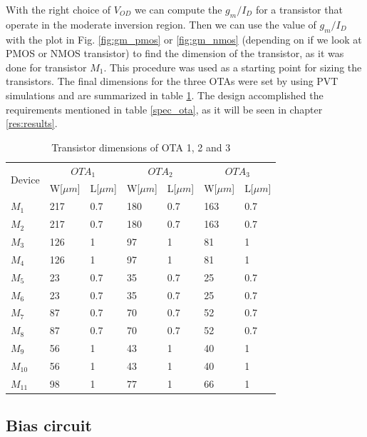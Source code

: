 With the right choice of $V_{OD}$ we can compute the $g_m/I_D$ for a transistor that operate in the moderate inversion region. Then we can use the value of $g_m/I_D$ with the plot in Fig. \ref{fig:gm_pmos} or \ref{fig:gm_nmos} (depending on if we look at PMOS or NMOS transistor) to find the dimension of the transistor, as it was done for transistor $M_1$. This procedure was used as a starting point for sizing the transistors. The final dimensions for the three OTAs were set by using PVT simulations and are summarized in table \ref{final_ota}. The design accomplished the requirements mentioned in table \ref{spec_ota}, as it will be seen in chapter \ref{res:results}.

\begin{table}[h]
\centering
\caption{Transistor dimensions of OTA 1, 2 and 3}
\label{final_ota}
\begin{tabular}{l||l|l||l|l||l|l}
\hline
\multirow{2}{*}{Device} & \multicolumn{2}{c||}{$OTA_1$} & \multicolumn{2}{c||}{$OTA_2$} & \multicolumn{2}{c}{$OTA_3$}\\\cline{2-7}
                        &W[$\mu m$] & L[$\mu m$]& W[$\mu m$] & L[$\mu m$] & W[$\mu m$] & L[$\mu m$]\\\hline
            $M_1$       & 217 & 0.7 & 180 & 0.7 & 163 & 0.7\\
            $M_2$        & 217 & 0.7 & 180 & 0.7 & 163 & 0.7\\
            $M_3$        & 126 & 1 & 97 & 1 & 81 & 1\\
            $M_4$        & 126 & 1 & 97 & 1 & 81 & 1\\
            $M_5$        & 23 & 0.7 & 35 & 0.7 & 25 & 0.7\\
            $M_6$        & 23 & 0.7 & 35 & 0.7 & 25 & 0.7\\
            $M_7$        & 87 & 0.7 & 70 & 0.7 & 52 & 0.7\\
            $M_8$        & 87 & 0.7 & 70 & 0.7 & 52 & 0.7\\
            $M_9$        & 56 & 1 & 43 & 1 & 40 & 1\\
            $M_{10}$        & 56 & 1 & 43 & 1 & 40 & 1\\
            $M_{11}$        & 98 & 1 & 77 & 1 & 66 & 1\\
\hline            
\end{tabular}
\end{table}

\subsection{Bias circuit}

